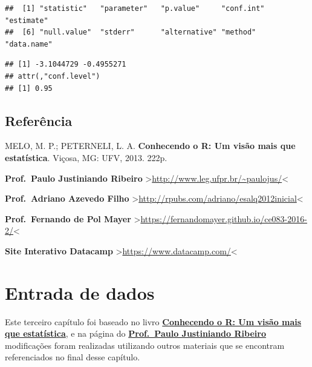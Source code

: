 \documentclass[
]{book}
\newenvironment{Shaded}{\begin{snugshade}}{\end{snugshade}}
\newcommand{\CommentTok}[1]{\textcolor[rgb]{0.56,0.35,0.01}{\textit{#1}}}
\newcommand{\NormalTok}[1]{#1}
\newcommand{\OperatorTok}[1]{\textcolor[rgb]{0.81,0.36,0.00}{\textbf{#1}}}
\begin{document}
\begin{verbatim}
##  [1] "statistic"   "parameter"   "p.value"     "conf.int"    "estimate"   
##  [6] "null.value"  "stderr"      "alternative" "method"      "data.name"
\end{verbatim}

\begin{Shaded}
\end{Shaded}

\begin{verbatim}
## [1] -3.1044729 -0.4955271
## attr(,"conf.level")
## [1] 0.95
\end{verbatim}

\hypertarget{referuxeancia-1}{%
\section{Referência}\label{referuxeancia-1}}

MELO, M. P.; PETERNELI, L. A. \textbf{Conhecendo o R: Um visão mais que estatística}. Viçosa, MG: UFV, 2013. 222p.

\textbf{Prof.~Paulo Justiniando Ribeiro} \textgreater{}\url{http://www.leg.ufpr.br/~paulojus/}\textless{}

\textbf{Prof.~Adriano Azevedo Filho} \textgreater{}\url{http://rpubs.com/adriano/esalq2012inicial}\textless{}

\textbf{Prof.~Fernando de Pol Mayer} \textgreater{}\url{https://fernandomayer.github.io/ce083-2016-2/}\textless{}

\textbf{Site Interativo Datacamp} \textgreater{}\url{https://www.datacamp.com/}\textless{}

\hypertarget{entrada-de-dados}{%
\chapter{Entrada de dados}\label{entrada-de-dados}}

Este terceiro capítulo foi baseado no livro \href{https://www.editoraufv.com.br/produto/conhecendo-o-r-uma-visao-mais-que-estatistica/1109294}{\textbf{Conhecendo o R: Um visão mais que estatística}}, e na página do \href{http://www.leg.ufpr.br/~paulojus/}{\textbf{Prof.~Paulo Justiniando Ribeiro}} modificações foram realizadas utilizando outros materiais que se encontram referenciados no final desse capítulo.
\end{document}

